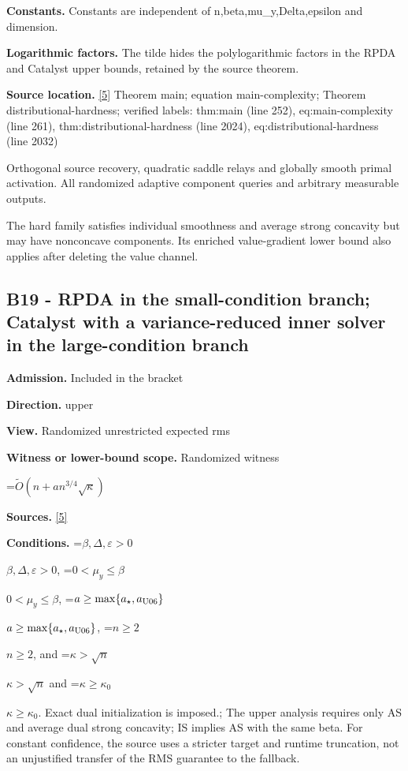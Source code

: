 \documentclass[10pt,a4paper]{article}
\newcommand{\AtlasMath}[1]{\par\begingroup\centering\setbox0=\hbox{$\displaystyle #1$}\ifdim\wd0>1.4\linewidth\typeout{ATLAS WIDE FORMULA: \the\wd0}\fi\ifdim\wd0>\linewidth\resizebox{\linewidth}{!}{\box0}\else\box0\fi\par\endgroup}
\newcommand{\AtlasInlineMath}[1]{\begingroup\setbox0=\hbox{$#1$}\ifdim\wd0>.4\linewidth\endgroup\AtlasMath{#1}\else\endgroup$#1$\fi}
\begin{document}
\textbf{Constants.} Constants are independent of n,beta,mu\_y,Delta,epsilon and dimension.



\textbf{Logarithmic factors.} The tilde hides the polylogarithmic factors in the RPDA and Catalyst upper bounds, retained by the source theorem.



\textbf{Source location.} \href{https://github.com/WU-Wendao/Colombo/blob/main/colombo_sensorium/Complexity_altas/data/sources/colombo/U06/manuscript.pdf}{[5]} Theorem main; equation main-complexity; Theorem distributional-hardness; verified labels: thm:main (line 252), eq:main-complexity (line 261), thm:distributional-hardness (line 2024), eq:distributional-hardness (line 2032)



Orthogonal source recovery, quadratic saddle relays and globally smooth primal activation. All randomized adaptive component queries and arbitrary measurable outputs.



The hard family satisfies individual smoothness and average strong concavity but may have nonconcave components. Its enriched value-gradient lower bound also applies after deleting the value channel.



\subsection{B19 - RPDA in the small-condition branch; Catalyst with a variance-reduced inner solver in the large-condition branch}


\textbf{Admission.} Included in the bracket



\textbf{Direction.} upper



\textbf{View.} Randomized unrestricted expected rms



\textbf{Witness or lower-bound scope.} Randomized witness



\AtlasMath{\widetilde O(n+a n^{3/4}\sqrt\kappa)}


\textbf{Sources.} \href{https://github.com/WU-Wendao/Colombo/blob/main/colombo_sensorium/Complexity_altas/data/sources/colombo/U06/manuscript.pdf}{[5]}



\textbf{Conditions.} \AtlasInlineMath{\beta,\Delta,\varepsilon>0}, \AtlasInlineMath{0<\mu_y\le\beta}, \AtlasInlineMath{a\ge\max\{a_\star,a_{\rm U06}\}}, \AtlasInlineMath{n\ge2}, and \AtlasInlineMath{\kappa>\sqrt n} and \AtlasInlineMath{\kappa\ge\kappa_0}. Exact dual initialization is imposed.; The upper analysis requires only AS and average dual strong concavity; IS implies AS with the same beta. For constant confidence, the source uses a stricter target and runtime truncation, not an unjustified transfer of the RMS guarantee to the fallback.
\end{document}
